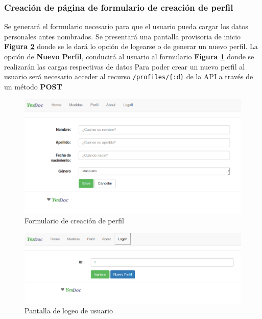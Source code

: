 \subsubsection{Creación de página de formulario de creación de perfil}      
Se generará el formulario necesario para que el usuario pueda cargar los datos personales antes nombrados. Se presentará una pantalla provisoria de inicio \textbf{Figura \ref{logeo}}  donde se le dará lo opción de logearse o de generar un nuevo perfil.
La opción de \textbf{Nuevo Perfil}, conducirá al usuario al formulario \textbf{Figura \ref{crear_perfil}} donde se realizarán las cargas respectivas de datos
      Para poder crear un nuevo perfil al usuario será necesario  acceder al recurso \texttt{/profiles/\{:d\}} de la API a través de un método \textbf{POST}
    \begin{figure}[h]
        \centering
        \includegraphics[width=1\textwidth]{img/tp1_parte2/1-crear_perfil}
        \caption{Formulario de creación de perfil}
		\label{crear_perfil}
    \end{figure}
    \begin{figure}[h]
        \centering
        \includegraphics[width=1\textwidth]{img/tp1_parte2/1-logeo}
        \caption{Pantalla de logeo de usuario}
		\label{logeo}
    \end{figure}

